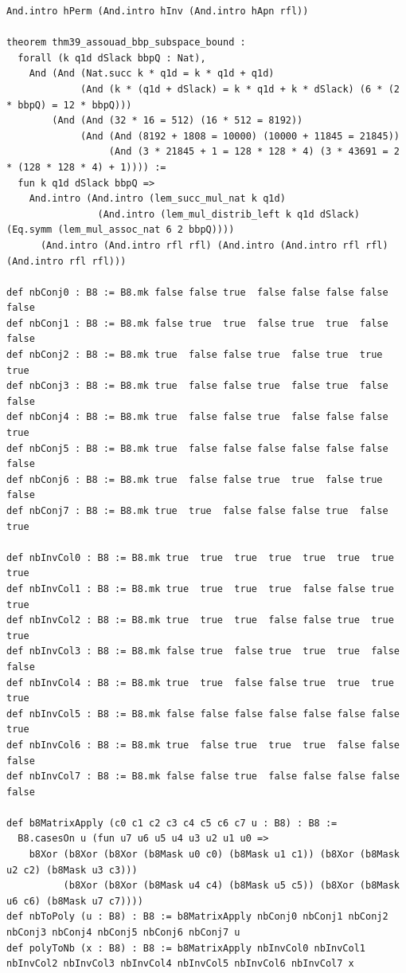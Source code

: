 \documentclass[11pt,letterpaper]{article}
\theoremstyle{spectralthm}
\begin{document}
\begin{lstlisting}[language=Lean4,caption={Standalone Pure Init.Prelude Term-Mode Lean 4 Kernel Suite (thm30--thm61, v0.0.0, 0 sorry, 0 axioms).},label={lst:lean_unified}]
    And.intro hPerm (And.intro hInv (And.intro hApn rfl))

theorem thm39_assouad_bbp_subspace_bound :
  forall (k q1d dSlack bbpQ : Nat),
    And (And (Nat.succ k * q1d = k * q1d + q1d)
             (And (k * (q1d + dSlack) = k * q1d + k * dSlack) (6 * (2 * bbpQ) = 12 * bbpQ)))
        (And (And (32 * 16 = 512) (16 * 512 = 8192))
             (And (And (8192 + 1808 = 10000) (10000 + 11845 = 21845))
                  (And (3 * 21845 + 1 = 128 * 128 * 4) (3 * 43691 = 2 * (128 * 128 * 4) + 1)))) :=
  fun k q1d dSlack bbpQ =>
    And.intro (And.intro (lem_succ_mul_nat k q1d)
                (And.intro (lem_mul_distrib_left k q1d dSlack) (Eq.symm (lem_mul_assoc_nat 6 2 bbpQ))))
      (And.intro (And.intro rfl rfl) (And.intro (And.intro rfl rfl) (And.intro rfl rfl)))

def nbConj0 : B8 := B8.mk false false true  false false false false false
def nbConj1 : B8 := B8.mk false true  true  false true  true  false false
def nbConj2 : B8 := B8.mk true  false false true  false true  true  true
def nbConj3 : B8 := B8.mk true  false false true  false true  false false
def nbConj4 : B8 := B8.mk true  false false true  false false false true
def nbConj5 : B8 := B8.mk true  false false false false false false false
def nbConj6 : B8 := B8.mk true  false false true  true  false true  false
def nbConj7 : B8 := B8.mk true  true  false false false true  false true

def nbInvCol0 : B8 := B8.mk true  true  true  true  true  true  true  true
def nbInvCol1 : B8 := B8.mk true  true  true  true  false false true  true
def nbInvCol2 : B8 := B8.mk true  true  true  false false true  true  true
def nbInvCol3 : B8 := B8.mk false true  false true  true  true  false false
def nbInvCol4 : B8 := B8.mk true  true  false false true  true  true  true
def nbInvCol5 : B8 := B8.mk false false false false false false false true
def nbInvCol6 : B8 := B8.mk true  false true  true  true  false false false
def nbInvCol7 : B8 := B8.mk false false true  false false false false false

def b8MatrixApply (c0 c1 c2 c3 c4 c5 c6 c7 u : B8) : B8 :=
  B8.casesOn u (fun u7 u6 u5 u4 u3 u2 u1 u0 =>
    b8Xor (b8Xor (b8Xor (b8Mask u0 c0) (b8Mask u1 c1)) (b8Xor (b8Mask u2 c2) (b8Mask u3 c3)))
          (b8Xor (b8Xor (b8Mask u4 c4) (b8Mask u5 c5)) (b8Xor (b8Mask u6 c6) (b8Mask u7 c7))))
def nbToPoly (u : B8) : B8 := b8MatrixApply nbConj0 nbConj1 nbConj2 nbConj3 nbConj4 nbConj5 nbConj6 nbConj7 u
def polyToNb (x : B8) : B8 := b8MatrixApply nbInvCol0 nbInvCol1 nbInvCol2 nbInvCol3 nbInvCol4 nbInvCol5 nbInvCol6 nbInvCol7 x


\end{lstlisting}
\end{document}
